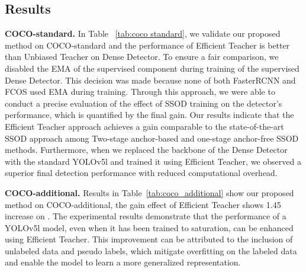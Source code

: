 \documentclass[10pt,twocolumn,letterpaper]{article}
\begin{document}
\subsection{Results}

\textbf{COCO-standard.} In Table ~\ref{tab:coco standard}, we validate our proposed method on COCO-standard and the performance of Efficient Teacher is better than Unbiased Teacher on Dense Detector. To ensure a fair comparison, we disabled the EMA of the supervised component during training of the supervised Dense Detector. This decision was made because none of both FasterRCNN and FCOS used EMA during training. Through this approach, we were able to conduct a precise evaluation of the effect of SSOD training on the detector's performance, which is quantified by the final gain. Our results indicate that the Efficient Teacher approach achieves a gain comparable to the state-of-the-art SSOD approach among Two-stage anchor-based and one-stage anchor-free SSOD methods. Furthermore, when we replaced the backbone of the Dense Detector with the standard YOLOv5l and trained it using Efficient Teacher, we observed a superior final detection performance with reduced computational overhead.

\textbf{COCO-additional.} Results in Table~\ref{tab:coco_additional} show our proposed method on COCO-additional, the gain effect of Efficient Teacher shows 1.45 increase on . The experimental results demonstrate that the performance of a YOLOv5l model, even when it has been trained to saturation, can be enhanced using Efficient Teacher. This improvement can be attributed to the inclusion of unlabeled data and pseudo labels, which mitigate overfitting on the labeled data and enable the model to learn a more generalized representation.
\begin{table}[h]
  \centering 
  \caption{Experimental results on COCO-additional.}
  \label{tab:coco_additional}
\end{table}
\end{document}
